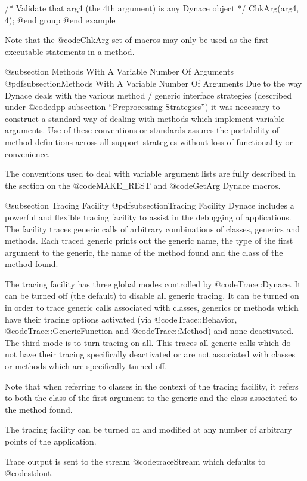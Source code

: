 /*  Validate that arg4 (the 4th argument) is any Dynace object  */
ChkArg(arg4, 4);
@end group
@end example


Note that the @code{ChkArg} set of macros may only be used as the first
executable statements in a method.

@subsection Methods With A Variable Number Of Arguments
@pdfsubsection{Methods With A Variable Number Of Arguments}
Due to the way Dynace deals with the various method / generic interface
strategies (described under @code{dpp} subsection ``Preprocessing
Strategies'') it was necessary to construct a standard way of dealing
with methods which implement variable arguments.  Use of these
conventions or standards assures the portability of method definitions
across all support strategies without loss of functionality or
convenience.

The conventions used to deal with variable argument lists are fully
described in the section on the @code{MAKE_REST} and @code{GetArg}
Dynace macros.

@subsection Tracing Facility
@pdfsubsection{Tracing Facility}
Dynace includes a powerful and flexible tracing facility to assist
in the debugging of applications.  The facility traces generic calls
of arbitrary combinations of classes, generics and methods.
Each traced generic prints out the generic name, the type of the first
argument to the generic, the name of the method found and the class
of the method found.

The tracing facility has three global modes controlled by
@code{Trace::Dynace}.  It can be turned off (the default)
to disable all generic tracing.  It can be turned on in order to
trace generic calls associated with classes, generics or methods
which have their tracing options activated (via @code{Trace::Behavior},
@code{Trace::GenericFunction} and @code{Trace::Method}) and none
deactivated.  The third mode is to turn tracing on all.  This traces
all generic calls which do not have their tracing specifically
deactivated or are not associated with classes or methods which
are specifically turned off.

Note that when referring to classes in the context of the tracing
facility, it refers to both the class of the first argument to
the generic and the class associated to the method found.

The tracing facility can be turned on and modified at any number of
arbitrary points of the application.

Trace output is sent to the stream @code{traceStream} which defaults
to @code{stdout}.

